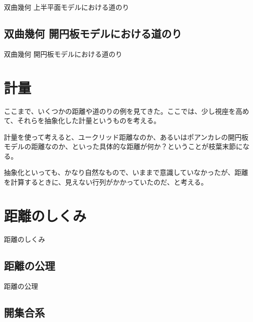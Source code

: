 双曲幾何 上半平面モデルにおける道のり

\newpage


\subsection{双曲幾何 開円板モデルにおける道のり}

双曲幾何 開円板モデルにおける道のり

\newpage


\section{計量}

ここまで、いくつかの距離や道のりの例を見てきた。ここでは、少し視座を高めて、それらを抽象化した計量というものを考える。

計量を使って考えると、ユークリッド距離なのか、あるいはポアンカレの開円板モデルの距離なのか、といった具体的な距離が何か？ということが枝葉末節になる。

抽象化といっても、かなり自然なもので、いままで意識していなかったが、距離を計算するときに、見えない行列がかかっていたのだ、と考える。

\newpage


\section{距離のしくみ}

距離のしくみ

\newpage


\subsection{距離の公理}

距離の公理

\newpage


\subsection{開集合系}

